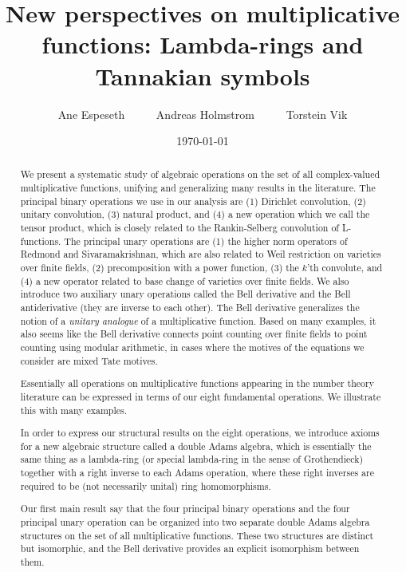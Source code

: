 \documentclass[a4paper]{article}
\title{New perspectives on multiplicative functions: Lambda-rings and Tannakian symbols}
\author{Ane Espeseth \ \ \ \ \ Andreas Holmstrom \ \ \ \ \ Torstein Vik}
\date{\today}
\theoremstyle{definition}
\theoremstyle{remark}
\begin{document}
\maketitle

\begin{abstract}
We present a systematic study of algebraic operations on the set of all complex-valued multiplicative functions, unifying and generalizing many results in the literature. The principal binary operations we use in our analysis are (1) Dirichlet convolution, (2) unitary convolution, (3) natural product, and (4) a new operation which we call the tensor product, which is closely related to the Rankin-Selberg convolution of L-functions. The principal unary operations are (1) the higher norm operators of Redmond and Sivaramakrishnan, which are also related to Weil restriction on varieties over finite fields, (2) precomposition with a power function, (3) the $k$'th convolute, and (4) a new operator related to base change of varieties over finite fields. We also introduce two auxiliary unary operations called the Bell derivative and the Bell antiderivative (they are inverse to each other). The Bell derivative generalizes the notion of a \emph{unitary analogue} of a multiplicative function. Based on many examples, it also seems like the Bell derivative connects point counting over finite fields to point counting using modular arithmetic, in cases where the motives of the equations we consider are mixed Tate motives.

Essentially all operations on multiplicative functions appearing in the number theory literature can be expressed in terms of our eight fundamental operations. We illustrate this with many examples.

In order to express our structural results on the eight operations, we introduce axioms for a new algebraic structure called a double Adams algebra, which is essentially the same thing as a lambda-ring (or special lambda-ring in the sense of Grothendieck) together with a right inverse to each Adams operation, where these right inverses are required to be (not necessarily unital) ring homomorphisms.

Our first main result say that the four principal binary operations and the four principal unary operation can be organized into two separate double Adams algebra structures on the set of all multiplicative functions. These two structures are distinct but isomorphic, and the Bell derivative provides an explicit isomorphism between them.


\end{abstract}
\end{document}
